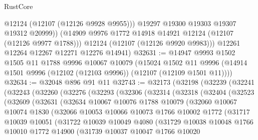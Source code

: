 \begin{lexlean}{RustCore}
\begin{coremodule}
              @12124
              (@12107 (@12126 @9928 @9955)))
            @19297
            @19300
            @19303
            @19307
            @19312
            @20999))
        (@14909 @9976 @1772 @14918 @14921 @12124 (@12107 (@12126 @9977 @1788)))
        @12124
        (@12107 (@12126 @9920 @9983)))
      @12261
      @12264
      @12267
      @12271
      @12276
      @14941)
@32631 := @14947
    @9993
    @1502
    @1505
    @11
    @1788
    @9996
    @10067
    @10079
    (@15024
      @1502
      @11
      @9996
      (@14914 @1501 @9996 (@12102 (@12103 @9996)) (@12107 (@12109 @1501 @11))))
@32634 := @32048 @896 @91 @11
@32743 := @32173
    (@32198
      (@32239
        (@32241
          (@32243
            (@32260
              (@32276
                (@32293
                  (@32306
                    (@32314
                      (@32318
                        (@32404
                          (@32523
                            (@32609
                              (@32631
                                (@32634
                                  @10067
                                  @10076
                                  @1788
                                  @10079
                                  (@32060
                                    @10067
                                    @10074
                                    @1830
                                    (@32066
                                      @10053
                                      @10066
                                      @10073
                                      @1766
                                      @10002
                                      @1772
                                      (@31717
                                        @10039
                                        @10051
                                        (@31722
                                          @10039
                                          @10049
                                          @4080
                                          (@31729
                                            @10038
                                            @10048
                                            @1766
                                            @10010
                                            @1772
                                            @14900
                                            (@31739
                                              @10037
                                              @10047
                                              @1766
                                              @10020

\end{coremodule}
\end{lexlean}
